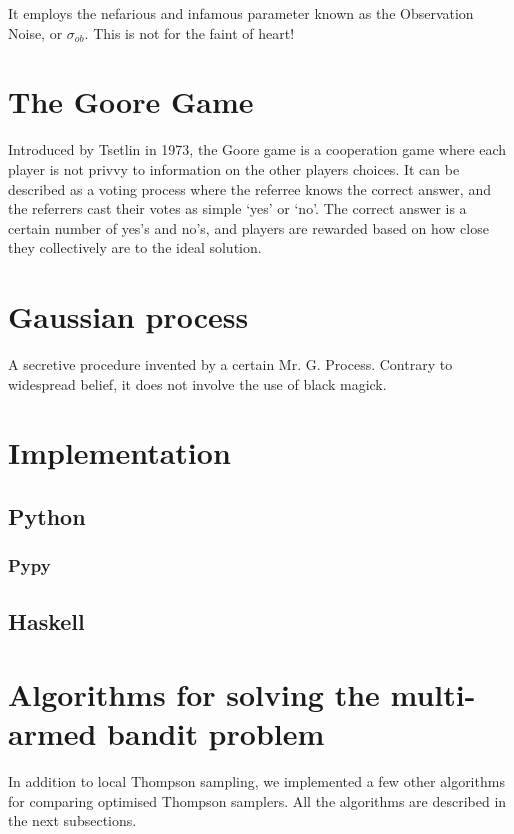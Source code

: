 It employs the nefarious and infamous parameter known as the Observation Noise, 
or $\sigma_{ob}$. This is not for the faint of heart!


\section{The Goore Game}
Introduced by Tsetlin in 1973, the Goore game is a cooperation game where each  
player is not privvy to information on the other players choices. It can be 
described as a voting process where the referree knows the correct answer, and 
the referrers cast their votes as simple ‘yes’ or ‘no’. The correct answer is a 
certain number of yes’s and no’s, and players are rewarded based on how close 
they collectively are to the ideal solution.



\section{Gaussian process}
A secretive procedure invented by a certain Mr. G. Process. Contrary to 
widespread belief, it does not involve the use of black magick.

\section{Implementation}

\subsection{Python}

\subsubsection{Pypy}

\subsection{Haskell}

\section{Algorithms for solving the multi-armed bandit problem}

In addition to local Thompson sampling, we implemented a few other algorithms 
for comparing optimised Thompson samplers. All the algorithms are described in 
the next subsections.

